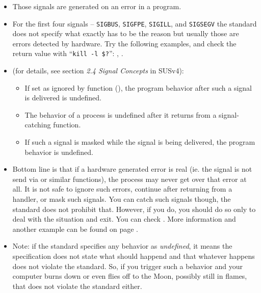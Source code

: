 \begin{itemize}
\item Those signals are generated on an error in a program.
\item For the first four signals -- \texttt{SIGBUS}, \texttt{SIGFPE},
\texttt{SIGILL}, and \texttt{SIGSEGV} the standard does not specify what exactly
has to be the reason but usually those are errors detected by hardware.
Try the following examples, and check the return value with ``\texttt{kill -l
\$?}'': ,
.
\item \label{SPECIALSIGNALS}  (for details, see section \emph{2.4 Signal Concepts} in
SUSv4):
\begin{itemize}
\item If set as ignored by function (), the program behavior
after such a signal is delivered is undefined.
\item The behavior of a process is undefined after it returns from a
signal-catching function.
\item If such a signal is masked while the signal is being delivered, the
program behavior is undefined.
\end{itemize}
\item Bottom line is that if a hardware generated error is real (ie. the signal
is not send via  or similar functions), the process may never get
over that error at all.  It is not safe to ignore such errors, continue after
returning from a handler, or mask such signals.  You can catch such signals
though, the standard does not prohibit that.  However, if you do, you should do
so only to deal with the situation and exit.
You can check . More information and another
example can be found on page \pageref{THREADS_SIGWAIT}.
\item Note: if the standard specifies any behavior as \emph{undefined}, it means
the specification does not state what should happend and that whatever happens
does not violate the standard.  So, if you trigger such a behavior and your
computer burns down or even flies off to the Moon, possibly still in flames,
that does not violate the standard either.
\end{itemize}

